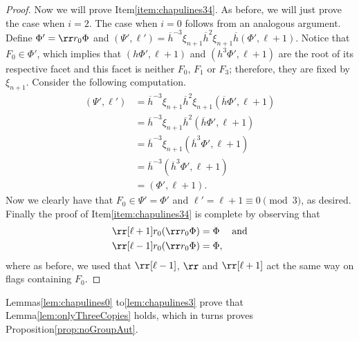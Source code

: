 \documentclass[final]{amsart}
\theoremstyle{plain}
\theoremstyle{definition}
\theoremstyle{remark}
\numberwithin{equation}{section}
\renewcommand{\{}{\lbrace}
\renewcommand{\}}{\rbrace}
\renewcommand{\bar}{\overline}
\newcommand{\kng}{{h}}
\newcommand{\etab}{\bar{\kng}}
\newcommand{\te}{\xi}
\begin{document}
\begin{proof}
Now we will prove Item\nobreakspace \ref {item:chapulines34}.
As before, we will just prove the case when $i=2$.
The case when $i=0$ follows from an analogous argument. Define $\Phi' = \rr r_{0} \Phi$ and $(\Psi',\ell') =\etab^{-3} \te_{n+1} \etab^{2} \te_{n+1} \etab(\Phi',\ell+1)$.
Notice that $F_{0} \in \Phi'$, which implies that $(\kng \Phi', \ell+1)$ and $(\kng^{3} \Phi', \ell+1)$ are the root of its respective facet and this facet is neither $F_{0}$, $F_{1}$ or $F_{3}$; therefore, they are fixed by $\te_{n+1}$.
Consider the following computation.
\[
\begin{aligned}
      \left( \Psi', \ell' \right)
      &= \etab^{-3} \te_{n+1} \etab^{2} \te_{n+1} \left(\etab \Phi', \ell+1 \right) \\
      &= \etab^{-3} \te_{n+1} \etab^{2}  \left( \etab \Phi', \ell +1 \right) \\
      &=  \etab^{-3} \te_{n+1}   \left(\etab^{3} \Phi', \ell+1 \right) \\
      &=  \etab^{-3}   \left( \etab^{3} \Phi', \ell+1 \right) \\
      &=(\Phi',\ell+1).
    \end{aligned}
\]
Now we clearly have that $F_{0} \in \Psi' = \Phi'$ and $\ell' = \ell+1\equiv 0 \pmod{3}$, as desired.
Finally the proof of Item\nobreakspace \ref {item:chapulines34} is complete by observing that
  \[\begin{aligned}
   \rr[\ell+1] r_{0}
  ( \rr r_{0}  \Phi) &= \Phi &\text{and} \\
   \rr[\ell-1] r_{0}  ( \rr r_{0} \Phi) &= \Phi,
    \end{aligned}
  \]
where as before, we used that $\rr[\ell-1]$, $\rr$ and $\rr[\ell+1]$ act the same way on flags containing $F_0$.
\end{proof} 

Lemmas\nobreakspace  \ref {lem:chapulines0} to\nobreakspace  \ref {lem:chapulines3}  prove that Lemma\nobreakspace \ref {lem:onlyThreeCopies} holds, which in turns proves Proposition\nobreakspace \ref {prop:noGroupAut}.
\end{document}
